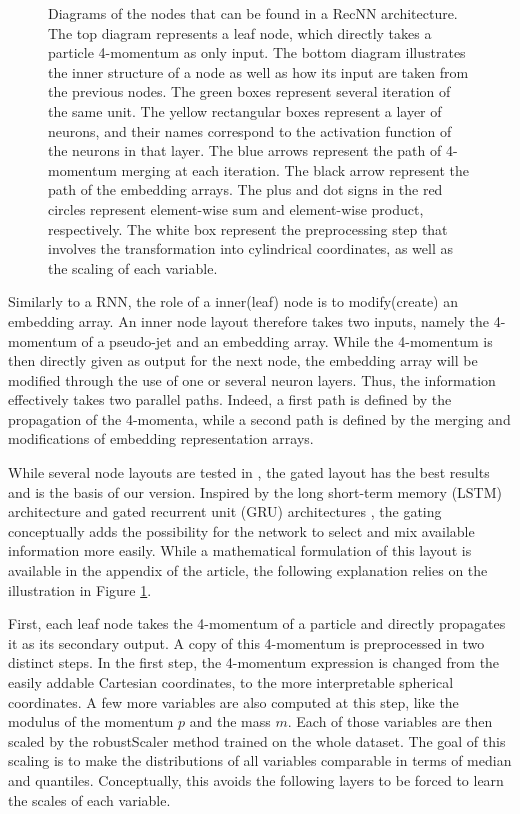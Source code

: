 \begin{figure}
\begin{center}
    
    \caption{Diagrams of the nodes that can be found in a RecNN architecture. The top diagram represents a leaf node, which directly takes a particle 4-momentum as only input. The bottom diagram illustrates the inner structure of a node as well as how its input are taken from the previous nodes. The green boxes represent several iteration of the same unit. The yellow rectangular boxes represent a layer of neurons, and their names correspond to the activation function of the neurons in that layer. The blue arrows represent the path of 4-momentum merging at each iteration. The black arrow represent the path of the embedding arrays. The plus and dot signs in the red circles represent element-wise sum and element-wise product, respectively. The white box represent the preprocessing step that involves the transformation into cylindrical coordinates, as well as the scaling of each variable.}
    \label{fig:recnn}
    \end{center}
\end{figure}

Similarly to a RNN, the role of a inner(leaf) node is to modify(create) an embedding array. An inner node layout therefore takes two inputs, namely the 4-momentum of a pseudo-jet and an embedding array. While the 4-momentum is then directly given as output for the next node, the embedding array will be modified through the use of one or several neuron layers. Thus, the information effectively takes two parallel paths. Indeed, a first path is defined by the propagation of the 4-momenta, while a second path is defined by the merging and modifications of embedding representation arrays. 

While several node layouts are tested in \cite{Louppe:2017ipp}, the gated layout has the best results and is the basis of our version. Inspired by the long short-term memory (LSTM) architecture \cite{lstm} and gated recurrent unit (GRU) architectures \cite{GRU}, the gating conceptually adds the possibility for the network to select and mix available information more easily. While a mathematical formulation of this layout is available in the appendix of the article, the following explanation relies on the illustration in Figure \ref{fig:recnn}. 

First, each leaf node takes the 4-momentum of a particle and directly propagates it as its secondary output. A copy of this 4-momentum is preprocessed in two distinct steps. In the first step, the 4-momentum expression is changed from the easily addable Cartesian coordinates, to the more interpretable spherical coordinates. A few more variables are also computed at this step, like the modulus of the momentum $p$ and the mass $m$. Each of those variables are then scaled by the robustScaler method \cite{robustscale} trained on the whole dataset. The goal of this scaling is to make the distributions of all variables comparable in terms of median and quantiles. Conceptually, this avoids the following layers to be forced to learn the scales of each variable. 


